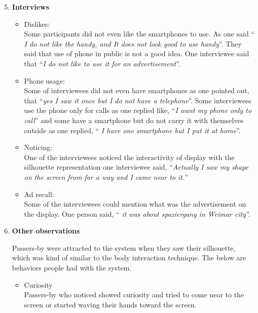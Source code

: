 \begin{enumerate}
\setcounter{enumi}{4}

\item \textbf{Interviews}

\begin{itemize}

\item Dislikes: \\
Some participants did not even like the smartphones to use. As one said ``\emph{ I do not like the handy, and It does not look good to use handy}''. They said that use of phone in public is not a good idea. One interviewee said that ``\emph{I do not like to use it for an advertisement}''. 

\item Phone usage: \\
Some of interviewees did not even have smartphones as one pointed out, that ``\emph{yes I saw it once but I do not have a telephone}''. Some interviewees use the phone only for calls as one replied like, ``\emph{I want my phone only to call}'' and some have a smartphone but do not carry it with themselves outside as one replied, ``\emph{ I have one smartphone but I put it at home}''.

\item Noticing: \\
One of the interviewees noticed the interactivity of display with the silhouette representation one interviewee said, ``\emph{Actually I saw my shape on the screen from far a way and I came near to it.}''

\item Ad recall: \\
Some of the interviewees could mention what was the advertisement on the display. One person said, ``\emph{ it was about spaziergang in Weimar city}''.

\end{itemize}

\item \textbf{Other observations}

Passers-by were attracted to the system when they saw their silhouette, which was kind of similar to the body interaction technique. The below are behaviors people had with the system.

\begin{itemize}
\item Curiosity \\
Passers-by who noticed showed curiosity and tried to come near to the screen or started waving their hands toward the screen.
 


\end{itemize}
\end{enumerate}

